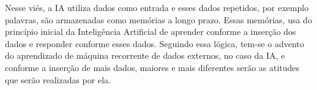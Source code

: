 Nesse viés, a IA utiliza dados como entrada e esses dados repetidos, por exemplo palavras, são armazenadas como memórias a longo prazo. Essas memórias, usa do princípio inicial da Inteligência Artificial de aprender conforme a inserção dos dados e responder conforme esses dados. Seguindo essa lógica, tem-se o advento do aprendizado de máquina recorrente de dados externos, no caso da IA, e conforme a inserção de mais dados, maiores e mais diferentes serão as atitudes que serão realizadas por ela.